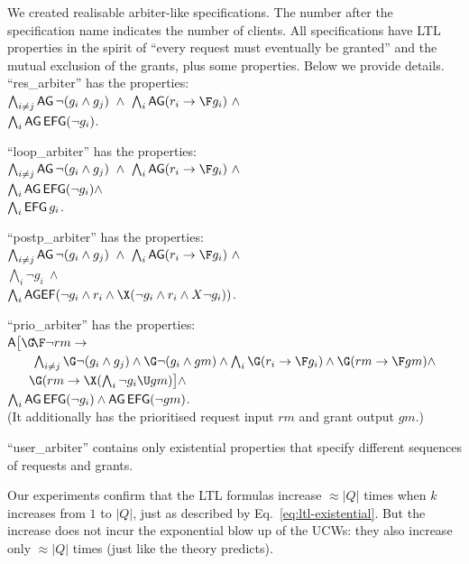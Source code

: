 

We created realisable arbiter-like \CTLstar specifications.
The number after the specification name indicates the number of clients.
All specifications have LTL properties in the spirit of ``every request must eventually be granted'' and the mutual exclusion of the grants,
plus some \CTLstar properties.
Below we provide details.
\li
\- ``res\_arbiter'' has the properties:\\
   $\bigwedge_{i \neq j} \AG \neg(g_i \land g_j) ~\land~ \bigwedge_{i} \AG (r_i \impl \F g_i) ~\land$\\
   $\bigwedge_{i} \operatorname{\mathsf{AG}}\operatorname{\mathsf{EFG}} (\neg g_i)$.

\- ``loop\_arbiter'' has the properties:\\
    $\bigwedge_{i \neq j} \AG \neg(g_i \land g_j) ~\land~ \bigwedge_{i} \AG (r_i \impl \F g_i) ~\land$\\
    $\bigwedge_{i} \operatorname{\mathsf{AG}}\operatorname{\mathsf{EFG}} (\neg g_i) \land$\\
    $\bigwedge_{i} \operatorname{\mathsf{EFG}} g_i$.
   
\- ``postp\_arbiter'' has the properties:\\
   $\bigwedge_{i \neq j} \AG \neg(g_i \land g_j) ~\land~ \bigwedge_{i} \AG (r_i \impl \F g_i) ~\land$ \\
   $\bigwedge_{i} \neg g_i ~\land$\\
   $\bigwedge_{i} \AGEF(\neg g_i \land r_i \land \X(\neg g_i \land r_i \land X \neg g_i ))$.

\- ``prio\_arbiter'' has the properties:\\
   $\A\big[\GF\neg rm \impl $\\
   $~~~~~~\bigwedge_{i \neq j} \G \neg(g_i \land g_j) \land \G\neg(g_i \land gm) \land \bigwedge_{i} \G (r_i \impl \F g_i) \land \G(rm \impl \F gm) \land $\\
   $~~~~~\G(rm \impl \X(\bigwedge_i \neg g_i \U gm)\big]\land$\\
   $\bigwedge_{i} \operatorname{\mathsf{AG}}\operatorname{\mathsf{EFG}} (\neg g_i) \land \operatorname{\mathsf{AG}}\operatorname{\mathsf{EFG}} (\neg gm)$.\\
   (It additionally has the prioritised request input $rm$ and grant output $gm$.)

\- ``user\_arbiter'' contains only existential properties
   that specify different sequences of requests and grants.
\il


Our experiments confirm that the LTL formulas increase $\approx |Q|$ times when $k$ increases from $1$ to $|Q|$,
just as described by Eq.~\ref{eq:ltl-existential}.
But the increase does not incur the exponential blow up of the UCWs:
they also increase only $\approx |Q|$ times (just like the theory predicts).


